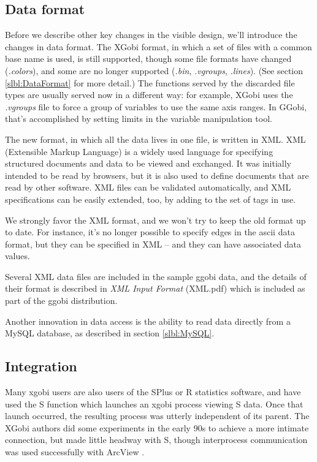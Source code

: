 \documentclass[11pt]{article}
\begin{document}
\subsection {Data format}

Before we describe other key changes in the visible design, we'll
introduce the changes in data format.  The XGobi format, in which a
set of files with a common base name is used, is still supported,
though some file formats have changed ({\em .colors}), and some are no
longer supported ({\em .bin}, {\em .vgroups}, {\em .lines}).  (See
section \ref{slbl:DataFormat} for more detail.) The functions served
by the discarded file types are usually served now in a different
way:  for example, XGobi uses the {\em .vgroups} file to force
a group of variables to use the same axis ranges.  In GGobi, that's
accomplished by setting limits in the variable manipulation tool.

The new format, in which all the data lives in one file, is written
in XML.  XML (Extensible Markup Language) is a widely used language
for specifying structured documents and data to be viewed and
exchanged.  It was initially intended to be read by browsers, but it
is also used to define documents that are read by other software.
XML files can be validated automatically, and XML specifications can
be easily extended, too, by adding to the set of tags in use.

We strongly favor the XML format, and we won't try to keep the
old format up to date.  For instance, it's no longer possible
to specify edges in the ascii data format, but they can be specified in
XML -- and they can have associated data values.

Several XML data files are included in the sample ggobi data, and
the details of their format is described in {\em XML Input Format}
(XML.pdf) which is included as part of the ggobi distribution.

Another innovation in data access is the ability to read data
directly from a MySQL database, as described in section \ref{slbl:MySQL}.

\subsection{Integration}

Many xgobi users are also users of the SPlus or R statistics software, and
have used the S function which launches an xgobi process viewing S data.
Once that launch occurred, the resulting process was utterly independent
of its parent.  The XGobi authors did some experiments in the early 90s
to achieve a more intimate connection, but made little headway with S,
though interprocess communication was used successfully with ArcView
\cite{SwayneBujaHubbell91,SMCM97}.
\end{document}
